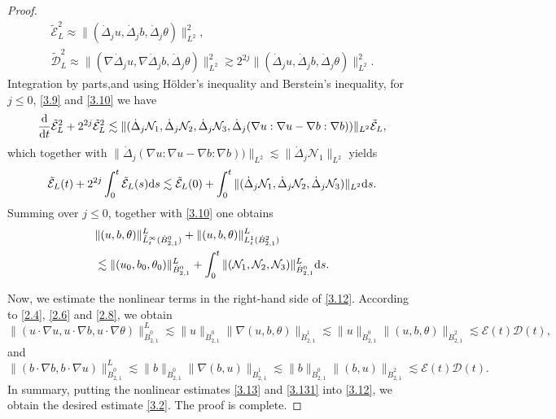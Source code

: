 \documentclass[reqno]{amsart}
\begin{document}
\begin{proof}
\begin{equation}
\begin{gathered}
 \tilde{\mathcal{E}}_L^2\approx\|(\dot{\Delta}_ju,\dot{\Delta}_jb,\dot{\Delta}_j\theta)
 \|_{L^2}^2, \\
 \tilde{\mathcal{D}}_L^2\approx\|(\nabla\dot{\Delta}_ju,\nabla\dot{\Delta}_jb,
 \dot{\Delta}_j\theta)\|_{L^2}^2\gtrsim 2^{2j}\|(\dot{\Delta}_ju,\dot{\Delta}_jb,
 \dot{\Delta}_j\theta)\|_{L^2}^2.
\end{gathered}
\end{equation}
Integration by parts,and using  H\"older's inequality and Berstein's inequality,
for $j\leqslant 0$, \eqref{3.9} and \eqref{3.10} we have
\[
 \frac{\rm d}{{\rm d}t}\tilde{\mathcal{E}}_L^2+2^{2j}
 \tilde{\mathcal{E}}_L^2\lesssim\|(\dot{\Delta}_j 
 \mathcal{N}_1,\dot{\Delta}_j \mathcal{N}_2,
 \dot{\Delta}_j \mathcal{N}_3,\dot{\Delta}_j (\nabla u:\nabla u-\nabla b:\nabla b))
 \|_{L^2}\tilde{\mathcal{E}}_L,
\]
which together with $\|\dot{\Delta}_j (\nabla u:\nabla u
-\nabla b:\nabla b))\|_{L^2}\lesssim\|\dot{\Delta}_j\mathcal{N}_1\|_{L^2}$
yields
\begin{equation}\label{3.11}
 \tilde{\mathcal{E}}_L(t)+2^{2j}\int_0^t\tilde{\mathcal{E}}_L(s){\rm d}s\lesssim\tilde{\mathcal{E}}_L(0)+\int_0^t\|(\dot{\Delta}_j \mathcal{N}_1,\dot{\Delta}_j \mathcal{N}_2,\dot{\Delta}_j \mathcal{N}_3)\|_{L^2}{\rm d}s.
\end{equation}
Summing over $j\leqslant 0$, together with \eqref{3.10} one obtains
 \begin{equation}\label{3.12}
\begin{aligned}
&\|(u,b,\theta)\|_{\tilde{L}^\infty_t(\dot{B}^0_{2,1})}^L+\|(u,b,\theta)
\|_{{L}^1_t(\dot{B}^2_{2,1})}^L \\
&\lesssim\|(u_0,b_0,\theta_0)\|_{\dot{B}^0_{2,1}}^L+\int_0^t\|( \mathcal{N}_1,
\mathcal{N}_2, \mathcal{N}_3)\|_{\dot{B}^0_{2,1}}^L{\rm d}s.
\end{aligned}
\end{equation}

Now, we estimate the nonlinear terms in the right-hand side of \eqref{3.12}.
According to \eqref{2.4}, \eqref{2.6} and \eqref{2.8}, we obtain
\begin{equation}\label{3.13}
 \|(u\cdot\nabla u,u\cdot\nabla b,u\cdot\nabla \theta)\|_{\dot{B}^0_{2,1}}^L
 \lesssim \|u\|_{{\dot{B}^0_{2,1}}}\|\nabla(u,b,\theta)\|_{{\dot{B}^1_{2,1}}}
 \lesssim \|u\|_{{\dot{B}^0_{2,1}}}\|(u,b,\theta)\|_{{\dot{B}^2_{2,1}}}
 \lesssim \mathcal{E}(t)\mathcal{D}(t),
\end{equation}
and
\begin{equation}\label{3.131}
 \|(b\cdot\nabla b,b\cdot\nabla u)\|_{\dot{B}^0_{2,1}}^L
 \lesssim \|b\|_{{\dot{B}^0_{2,1}}}\|\nabla(b,u)\|_{{\dot{B}^1_{2,1}}}
 \lesssim \|b\|_{{\dot{B}^0_{2,1}}}\|(b,u)\|_{{\dot{B}^2_{2,1}}}
 \lesssim \mathcal{E}(t)\mathcal{D}(t).
\end{equation}
In summary, putting the nonlinear estimates \eqref{3.13} and \eqref{3.131} into
\eqref{3.12}, we obtain the desired estimate \eqref{3.2}. The proof is complete.
 \end{proof}
\end{document}
